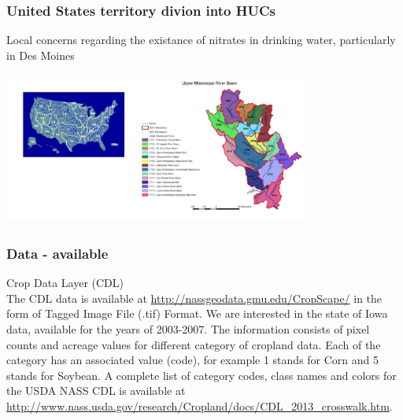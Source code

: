 \documentclass[xcolor=pdftex,dvipsnames,table]{beamer}
\begin{document}

\begin{frame}
\frametitle{United States territory divion into HUCs}
Local concerns regarding the existance of nitrates in drinking water, particularly in Des Moines

\begin{center}
\includegraphics[width=10cm, height=5cm]{HUC2-4-8.jpg} 
\end{center}

\end{frame}


\begin{frame}
\frametitle{Data - available}
 Crop Data Layer (CDL)\\


The CDL data is available at \href {CDL} {http://nassgeodata.gmu.edu/CropScape/} in the form of Tagged Image File (.tif) Format. We are interested in the state of Iowa data, available for the years of 2003-2007. The information consists of pixel counts and acreage values for different category of cropland data. Each of the category has an associated value (code), for example 1 stands for Corn and 5 stands for Soybean. A complete list of category codes, class names and colors for the USDA NASS CDL is available at \href{Codes}{http://www.nass.usda.gov/research/Cropland/docs/CDL_2013_crosswalk.htm}.

\end{frame}

\end{document}
